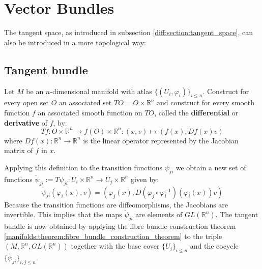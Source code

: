 \chapter{Vector Bundles}\label{diff:chapter:vector_bundles}
	The tangent space, as introduced in subsection \ref{diff:section:tangent_space}, can also be introduced in a more topological way:
\section{Tangent bundle}

	\begin{construct}
		Let $M$ be an $n$-dimensional manifold with atlas $\{(U_i, \varphi_i)\}_{i\leq n}$. Construct for every open set $O$ an associated set $TO = O\times\mathbb{R}^n$ and construct for every smooth function $f$ an associated smooth function on $TO$, called the \textbf{differential} or \textbf{derivative} of $f$, by:
		\begin{equation}
			\label{diff:manifolds:T_function}
			Tf:O\times\mathbb{R}^n\rightarrow f(O)\times\mathbb{R}^n:(x, v)\mapsto(f(x), Df(x)v)
		\end{equation}
		where $Df(x):\mathbb{R}^n\rightarrow\mathbb{R}^n$ is the linear operator represented by the Jacobian matrix of $f$ in $x$.
		
		Applying this definition to the transition functions $\psi_{ji}$ we obtain a new set of functions $\widetilde{\psi}_{ji} := T\psi_{ji}:U_i\times\mathbb{R}^n\rightarrow U_j\times\mathbb{R}^n$ given by:
		\begin{equation}
			\widetilde{\psi}_{ji}(\varphi_i(x), v) = \left(\varphi_j(x), D(\varphi_j\circ\varphi_i^{-1})(\varphi_i(x))v\right)
		\end{equation}
		Because the transition functions are diffeomorphisms, the Jacobians are invertible. This implies that the maps $\widetilde\psi_{ji}$ are elements of $GL(\mathbb{R}^n)$. The tangent bundle is now obtained by applying the fibre bundle construction theorem \ref{manifolds:theorem:fibre_bundle_construction_theorem} to the triple $(M, \mathbb{R}^n, GL(\mathbb{R}^n))$ together with the base cover $\{U_i\}_{i\leq n}$ and the cocycle $\{\widetilde\psi_{ji}\}_{i,j\leq n}$.
	\end{construct}
	
